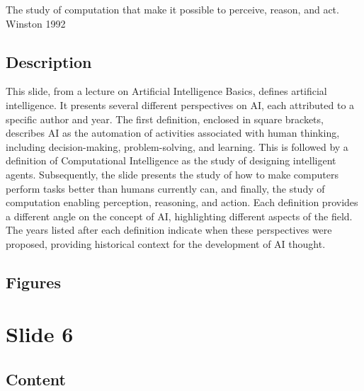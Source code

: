 \documentclass{article}%
\begin{document}
The study of computation that make it possible to perceive, reason, and act.
Winston 1992
%
\subsection{Description}%
This slide, from a lecture on Artificial Intelligence Basics, defines artificial intelligence.  It presents several different perspectives on AI, each attributed to a specific author and year.  The first definition, enclosed in square brackets, describes AI as the automation of activities associated with human thinking, including decision-making, problem-solving, and learning.  This is followed by a definition of Computational Intelligence as the study of designing intelligent agents.  Subsequently, the slide presents the study of how to make computers perform tasks better than humans currently can, and finally, the study of computation enabling perception, reasoning, and action.  Each definition provides a different angle on the concept of AI, highlighting different aspects of the field.  The years listed after each definition indicate when these perspectives were proposed, providing historical context for the development of AI thought.%
\subsection{Figures}%
\begin{figure}[H]%
\centering%
\end{figure}

%
\newpage%
\section{Slide 6}%
\label{sec:Slide6}%
\subsection{Content}%
%
\end{document}
